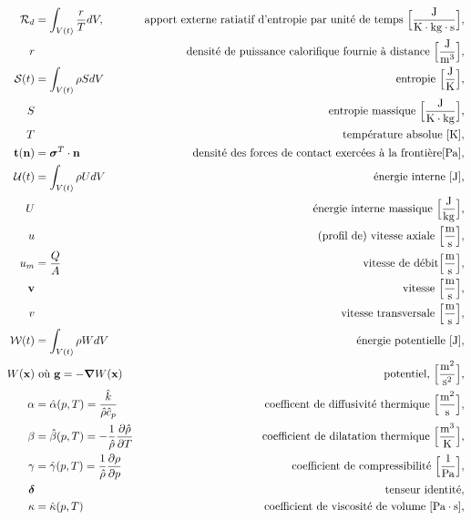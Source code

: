 \begin{align*}
      \mathcal{R}_d &= \int_{V(t)} \frac{r}{T} dV, & \textrm{apport externe ratiatif d'entropie par unité de temps }\Big[\si{\frac{J}{K \cdot kg \cdot s}}\Big],\\
      r & & \textrm{densité de puissance calorifique fournie à distance } \Big[\si{\frac{J}{m^3}}\Big],\\
      \mathcal{S}(t) &= \int_{V(t)} \rho S dV & \textrm{entropie } \Big[\si{\frac{J}{K}}\Big],\\
      S & & \textrm{entropie massique } \Big[\si{\frac{J}{K \cdot kg}}\Big],\\
      T & & \textrm{température absolue } [\si{K}],\\
      \vb{t}(\vb{n}) &= \bs{\sigma}^T \cdot \vb{n} & \textrm{densité des forces de contact exercées à la frontière} [\si{Pa}],\\
      \mathcal{U}(t) &= \int_{V(t)} \rho U dV & \textrm{énergie interne } [\si{J}],\\
      U & & \textrm{énergie interne massique } \Big[\si{\frac{J}{kg}}\Big],\\
      u & & \textrm{(profil de) vitesse axiale } \Big[\si{\frac{m}{s}}\Big],\\
      u_m &= \frac{Q}{A} & \textrm{vitesse de débit} \Big[\si{\frac{m}{s}}\Big],\\
      \vb{v} & & \textrm{vitesse } \Big[\si{\frac{m}{s}}\Big],\\
      v & & \textrm{vitesse transversale } \Big[\si{\frac{m}{s}}\Big],\\
      \mathcal{W}(t) &= \int_{V(t)} \rho W dV & \textrm{énergie potentielle } [\si{J}],\\
      W(\vb{x}) & \textrm{ où } \vb{g} = -\grad W(\vb{x}) & \textrm{potentiel, }\Big[\si{\frac{m^2}{s^2}}\Big],\\
      \alpha &= \hat{\alpha}(p,T) = \frac{\hat{k}}{\hat{\rho}\hat{c}_p} & \textrm{coefficent de diffusivité thermique } \Big[\si{\frac{m^2}{s}}\Big], \\
      \beta &= \hat{\beta}(p,T) = -\recip{\hat{\rho}} \pdv{\hat{\rho}}{T} & \textrm{coefficient de dilatation thermique } \Big[\si{\frac{m^3}{K}}\Big],\\
      \gamma &= \hat{\gamma}(p,T) = \recip{\hat{\rho}} \pdv{\rho}{p} & \textrm{coefficient de compressibilité } \Big[\si{\recip{Pa}}\Big],\\
      \bs{\delta} & & \textrm{tenseur identité},\\
      \kappa &= \hat{\kappa}(p, T) & \textrm{coefficient de viscosité de volume } [\si{Pa \cdot s}],\\

\end{align*}
